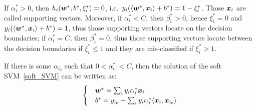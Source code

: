 If $\alpha_i^* > 0$, then $h_i(\boldsymbol{w}^*, b^*, \xi_i^*) = 0$, i.e.\ 
$y_i(\langle\boldsymbol{w}^*, \boldsymbol{x}_i\rangle + b^*) = 1 - \xi^*_i$. Those $\boldsymbol{x}_i$ are called supporting vectors. 
Moreover, if $\alpha^*_i < C$, then $\beta^*_i > 0$, hence $\xi^*_i = 0$ and
$y_i(\langle\boldsymbol{w}^*, \boldsymbol{x}_i\rangle + b^*) = 1$, thus those supporting vectors locate on the decision 
boundaries; if $\alpha^*_i = C$, then $\beta^*_i = 0$, thus those supporting vectors locate between the
decision boundaries if $\xi^*_i \leqslant 1$ and they are mis-classified if $\xi^*_i > 1$.

If there is some $\alpha_{i_0}$ such that 
$0 < \alpha_{i_0}^* < C$, then the solution of the soft SVM~\eqref{soft_SVM} can be written as:
\begin{equation}
    \begin{cases}
        &\boldsymbol{w}^* = \sum_i y_i \alpha^*_i \boldsymbol{x}_i\\
        &b^* = y_{i_0} - \sum_i y_i \alpha^*_i \langle \boldsymbol{x}_i, \boldsymbol{x}_{i_0}\rangle
    \end{cases}
\end{equation}

